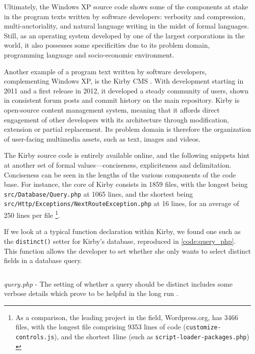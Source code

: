 Ultimately, the Windows XP source code shows some of the components at stake in the program texts written by software developers: verbosity and compression, multi-auctoriality, and natural language writing in the midst of formal languages. Still, as an operating system developed by one of the largest corporations in the world, it also possesses some specificities due to its problem domain, programming language and socio-economic environment.

Another example of a program text written by software developers, complementing Windows XP, is the Kirby CMS \citep{allgeier_kirby_2022}. With development starting in 2011 and a first release in 2012, it developed a steady community of users, shown in consistent forum posts and commit history on the main repository. Kirby is open-source content management system, meaning that it affords direct engagement of other developers with its architecture through modification, extension or partial replacement. Its problem domain is therefore the organization of user-facing multimedia assets, such as text, images and videos.

The Kirby source code is entirely available online, and the following snippets hint at another set of formal values—conciseness, expliciteness and delimitation. Conciseness can be seen in the lengths of the various components of the code base. For instance, the core of Kirby consists in 1859 files, with the longest being \lstinline{src/Database/Query.php} at 1065 lines, and the shortest being \lstinline{src/Http/Exceptions/NextRouteException.php} at 16 lines, for an average of 250 lines per file \footnote{As a comparison, the leading project in the field, Wordpress.org, has 3466 files, with the longest file comprising 9353 lines of code (\lstinline{customize-controls.js}), and the shortest 1line (such as \lstinline{script-loader-packages.php}) \citep{wordpress_wordpress_2023}}.

If we look at a typical function declaration within Kirby, we found one such as the \lstinline{distinct()} setter for Kirby's database, reproduced in \autoref{code:query_php}. This function allows the developer to set whether she only wants to select distinct fields in a database query.

\begin{listing}
  \inputminted{php}{./corpus/query.php}
  \caption{\emph{query.php} - The setting of whether a query should be distinct includes some verbose details which prove to be helpful in the long run \citep{allgeier_query_2021}.}
  \label{code:query_php}
\end{listing}

